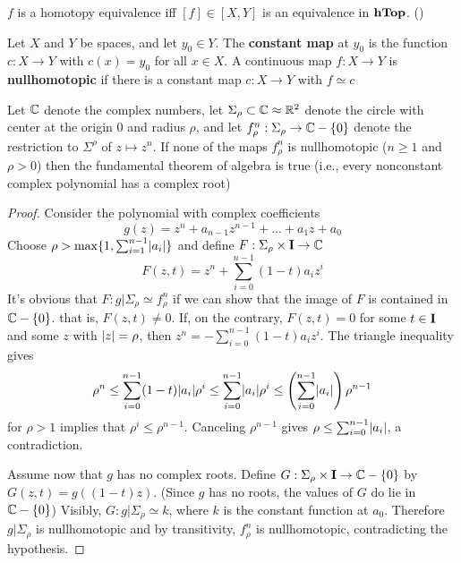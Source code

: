 \documentclass[11pt]{article}
\begin{document}
\(f\) is a homotopy equivalence iff \([f]\in[X,Y]\) is an equivalence in \(\operatorname{\textbf{hTop}}\). (\label{Problem1})

\begin{definition}[]
Let \(X\) and \(Y\) be spaces, and let \(y_0\in Y\). The \textbf{constant map} at \(y_0\) is the
function \(c:X\to Y\) with \(c(x)=y_0\) for all \(x\in X\). A continuous map \(f:X\to Y\) is
\textbf{nullhomotopic} if there is a constant map \(c:X\to Y\) with \(f\simeq c\)
\end{definition}

\begin{theorem}[]
\label{thm1.5}
Let \(\mathbb{C}\) denote the complex numbers, let \(\Sigma_\rho\subset\mathbb{C}\approx\mathbb{R}^2\) denote the circle with center at the origin
0 and radius \(\rho\), and let \(f_\rho^n:\Sigma_\rho\to\mathbb{C}-\{0\}\) denote the restriction to \(\Sigma^\rho\) of \(z\mapsto z^n\). If none
of the maps \(f_\rho^n\) is nullhomotopic (\(n\ge 1\) and \(\rho>0\)) then the fundamental theorem of
algebra is true (i.e., every nonconstant complex polynomial has a complex root)
\end{theorem}

\begin{proof}
Consider the polynomial with complex coefficients
\begin{equation*}
g(z)=z^n+a_{n-1}z^{n-1}+\dots+a_1z+a_0
\end{equation*}
Choose \(\rho>\max\{1,\sum_{i=1}^{n-1}\abs{a_i}\}\) and define \(F:\Sigma_\rho\times\operatorname{\textbf{I}}\to\mathbb{C}\)
\begin{equation*}
F(z,t)=z^n+\sum_{i=0}^{n-1}(1-t)a_iz^i
\end{equation*}
It's obvious that \(F:g|\Sigma_\rho\simeq f_\rho^n\) if we can show that the image of \(F\) is contained
in \(\mathbb{C}-\{0\}\). that is, \(F(z,t)\neq0\). If, on the contrary, \(F(z,t)=0\)  for some \(t\in\operatorname{\textbf{I}}\) and
some \(z\) with \(\abs{z}=\rho\), then \(z^n=-\sum_{i=0}^{n-1}(1-t)a_iz^i\). The triangle inequality gives
\begin{equation*}
\rho^n\le\sum_{i=0}^{n-1}(1-t)\abs{a_i}\rho^i\le\sum_{i=0}^{n-1}\abs{a_i}\rho^i\le\left(\sum_{i=0}^{n-1}\abs{a_i}\right)\rho^{n-1}
\end{equation*}
for \(\rho>1\) implies that \(\rho^i\le\rho^{n-1}\). Canceling \(\rho^{n-1}\) gives \(\rho\le\sum_{i=0}^{n-1}\abs{a_i}\),
a contradiction.

Assume now that \(g\) has no complex roots. Define \(G:\Sigma_\rho\times\operatorname{\textbf{I}}\to\mathbb{C}-\{0\}\) by
\(G(z,t)=g((1-t)z)\). (Since \(g\) has no roots, the values of \(G\) do lie in \(\mathbb{C}-\{0\}\))
Visibly, \(G:g|\Sigma_\rho\simeq k\), where \(k\) is the constant function at \(a_0\). Therefore \(g|\Sigma_\rho\) is
nullhomotopic and by transitivity, \(f_\rho^n\) is nullhomotopic, contradicting the hypothesis.
\end{proof}
\end{document}
